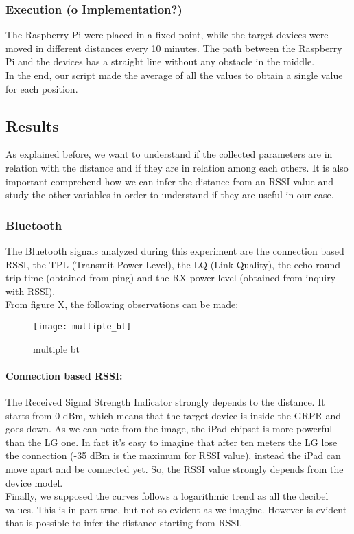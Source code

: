\subsubsection{Execution (o Implementation?)}
The Raspberry Pi were placed in a fixed point, while the target devices were moved in different distances every 10 minutes. The path between the Raspberry Pi and the devices has a straight line without any obstacle in the middle.\\
In the end, our script made the average of all the values to obtain a single value for each position.
\subsection{Results}
As explained before, we want to understand if the collected parameters are in relation with the distance and if they are in relation among each others. It is also important comprehend how we can infer the distance from an RSSI value and study the other variables in order to understand if they are useful in our case.
\subsubsection{Bluetooth}
The Bluetooth signals analyzed during this experiment are the connection based RSSI, the TPL (Transmit Power Level), the LQ (Link Quality), the echo round trip time (obtained from ping) and the RX power level (obtained from inquiry with RSSI).\\
From figure X, the following observations can be made:
\begin{figure}[htbp]
\centering
\texttt{[image: multiple\_bt]}
\caption{multiple bt}
\end{figure}
\paragraph{Connection based RSSI:} The Received Signal Strength Indicator strongly depends to the distance. It starts from 0 dBm, which means that the target device is inside the GRPR and goes down. As we can note from the image, the iPad chipset is more powerful than the LG one. In fact it's easy to imagine that after ten meters the LG lose the connection (-35 dBm is the maximum for RSSI value), instead the iPad can move apart and be connected yet. So, the RSSI value strongly depends from the device model.\\
Finally, we supposed the curves follows a logarithmic trend as all the decibel values. This is in part true, but not so evident as we imagine. However is evident that is possible to infer the distance starting from RSSI.
